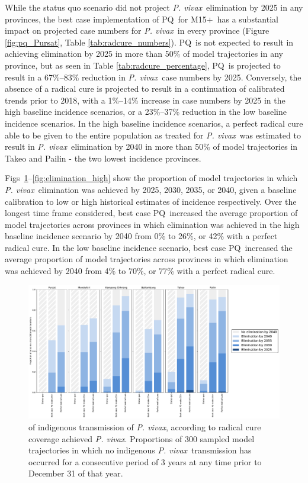 \documentclass[doublespacing]{bmcart}
\newcommand{\pv}{\textit{P. vivax}}
\newcommand{\males}{M15$+$}
\newcommand{\pq}{PQ}
\begin{document}
While the status quo scenario did not project \pv~elimination by 2025 in any provinces, the best case implementation of \pq~for \males~has a substantial impact on projected case numbers for \pv~in every province (Figure \ref{fig:pq_Pursat}, Table \ref{tab:radcure_numbers}). \pq~is not expected to result in achieving elimination by 2025 in more than 50\% of model trajectories in any province, but as seen in Table \ref{tab:radcure_percentage}, \pq~is projected to result in a 67\%--83\% reduction in \pv~case numbers by 2025. Conversely, the absence of a radical cure is projected to result in a continuation of calibrated trends prior to 2018, with a 1\%--14\% increase in case numbers by 2025 in the high baseline incidence scenarios, or a 23\%--37\% reduction in the low baseline incidence scenarios. In the high baseline incidence scenarios, a perfect radical cure able to be given to the entire population as treated for \pv~was estimated to result in \pv~elimination by 2040 in more than 50\% of model trajectories in Takeo and Pailin - the two lowest incidence provinces.

Figs~\ref{fig:elimination_low}--\ref{fig:elimination_high} show the proportion of model trajectories in which \pv~elimination was achieved by 2025, 2030, 2035, or 2040, given a baseline calibration to low or high historical estimates of incidence respectively. Over the longest time frame considered, best case \pq~increased the average proportion of model trajectories across provinces in which elimination was achieved in the high baseline incidence scenario by 2040 from 0\% to 26\%, or 42\% with a perfect radical cure. In the low baseline incidence scenario, best case \pq~increased the average proportion of model trajectories across provinces in which elimination was achieved by 2040 from 4\% to 70\%, or 77\% with a perfect radical cure.

\begin{figure}[h!]
\centering
\includegraphics[width=0.95\linewidth]{low_baseline.pdf}
\caption{ of indigenous transmission of \pv, according to radical cure coverage achieved \pv. Proportions of 300 sampled model trajectories in which no indigenous \pv~transmission has occurred for a consecutive period of 3 years at any time prior to December 31 of that year.}\label{fig:elimination_low}
\end{figure}
\end{document}
